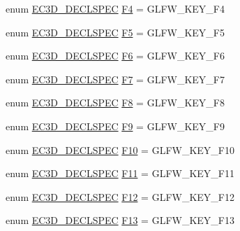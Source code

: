 \begin{DoxyCompactItemize}
\item 
enum \mbox{\hyperlink{_common_8h_aac42573e202ca3dd4d259c81691e2369}{E\+C3\+D\+\_\+\+D\+E\+C\+L\+S\+P\+EC}} \mbox{\hyperlink{classec_1_1_keyboard_ad1f7f78c96c7a59a21210d94e693fde7}{F4}} = G\+L\+F\+W\+\_\+\+K\+E\+Y\+\_\+\+F4
\item 
enum \mbox{\hyperlink{_common_8h_aac42573e202ca3dd4d259c81691e2369}{E\+C3\+D\+\_\+\+D\+E\+C\+L\+S\+P\+EC}} \mbox{\hyperlink{classec_1_1_keyboard_a7a9bd546b5eeba38a587303293246bb7}{F5}} = G\+L\+F\+W\+\_\+\+K\+E\+Y\+\_\+\+F5
\item 
enum \mbox{\hyperlink{_common_8h_aac42573e202ca3dd4d259c81691e2369}{E\+C3\+D\+\_\+\+D\+E\+C\+L\+S\+P\+EC}} \mbox{\hyperlink{classec_1_1_keyboard_a02fe21453cf1fd9a9c5f181ec9a8f714}{F6}} = G\+L\+F\+W\+\_\+\+K\+E\+Y\+\_\+\+F6
\item 
enum \mbox{\hyperlink{_common_8h_aac42573e202ca3dd4d259c81691e2369}{E\+C3\+D\+\_\+\+D\+E\+C\+L\+S\+P\+EC}} \mbox{\hyperlink{classec_1_1_keyboard_ad0da55a468002a1193b02ab3b342a267}{F7}} = G\+L\+F\+W\+\_\+\+K\+E\+Y\+\_\+\+F7
\item 
enum \mbox{\hyperlink{_common_8h_aac42573e202ca3dd4d259c81691e2369}{E\+C3\+D\+\_\+\+D\+E\+C\+L\+S\+P\+EC}} \mbox{\hyperlink{classec_1_1_keyboard_a89d166f0527389eb2eaec46dc1f86c79}{F8}} = G\+L\+F\+W\+\_\+\+K\+E\+Y\+\_\+\+F8
\item 
enum \mbox{\hyperlink{_common_8h_aac42573e202ca3dd4d259c81691e2369}{E\+C3\+D\+\_\+\+D\+E\+C\+L\+S\+P\+EC}} \mbox{\hyperlink{classec_1_1_keyboard_a3dbe3f47995a8defdc3c142bc0983a4c}{F9}} = G\+L\+F\+W\+\_\+\+K\+E\+Y\+\_\+\+F9
\item 
enum \mbox{\hyperlink{_common_8h_aac42573e202ca3dd4d259c81691e2369}{E\+C3\+D\+\_\+\+D\+E\+C\+L\+S\+P\+EC}} \mbox{\hyperlink{classec_1_1_keyboard_aa168a7e6cc3afa55dd5688e977fc6bfe}{F10}} = G\+L\+F\+W\+\_\+\+K\+E\+Y\+\_\+\+F10
\item 
enum \mbox{\hyperlink{_common_8h_aac42573e202ca3dd4d259c81691e2369}{E\+C3\+D\+\_\+\+D\+E\+C\+L\+S\+P\+EC}} \mbox{\hyperlink{classec_1_1_keyboard_a52c268ea148aa4b22142873360c91fc2}{F11}} = G\+L\+F\+W\+\_\+\+K\+E\+Y\+\_\+\+F11
\item 
enum \mbox{\hyperlink{_common_8h_aac42573e202ca3dd4d259c81691e2369}{E\+C3\+D\+\_\+\+D\+E\+C\+L\+S\+P\+EC}} \mbox{\hyperlink{classec_1_1_keyboard_a699bc14d848736ef074a47db2f568109}{F12}} = G\+L\+F\+W\+\_\+\+K\+E\+Y\+\_\+\+F12
\item 
enum \mbox{\hyperlink{_common_8h_aac42573e202ca3dd4d259c81691e2369}{E\+C3\+D\+\_\+\+D\+E\+C\+L\+S\+P\+EC}} \mbox{\hyperlink{classec_1_1_keyboard_a57c5cc1e503cb08d453b6fee1f2dea47}{F13}} = G\+L\+F\+W\+\_\+\+K\+E\+Y\+\_\+\+F13

\end{DoxyCompactItemize}
